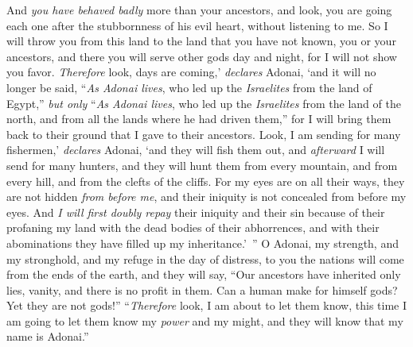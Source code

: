 \begin{biblechapter}
\verse And \textit{you have behaved badly} more than your ancestors, and look, you are going each one after the stubbornness of his evil heart, without listening to me.
\verse So I will throw you from this land to the land that you have not known, you or your ancestors, and there you will serve other gods day and night, for I will not show you favor.
 \textit{Therefore} look, days are coming,’ \textit{declares} Adonai, ‘and it will no longer be said, “\textit{As Adonai lives}, who led up the \textit{Israelites} from the land of Egypt,”
\verse \textit{but only} “\textit{As Adonai lives}, who led up the \textit{Israelites} from the land of the north, and from all the lands where he had driven them,” for I will bring them back to their ground that I gave to their ancestors.
\verse Look, I am sending for many fishermen,’ \textit{declares} Adonai, ‘and they will fish them out, and \textit{afterward} I will send for many hunters, and they will hunt them from every mountain, and from every hill, and from the clefts of the cliffs.
\verse For my eyes are on all their ways, they are not hidden \textit{from before me}, and their iniquity is not concealed from before my eyes.
\verse And \textit{I will first doubly repay} their iniquity and their sin because of their profaning my land with the dead bodies of their abhorrences, and with their abominations they have filled up my inheritance.’ ”
\verse O Adonai, my strength, and my stronghold, 
and my refuge in the day of distress, 
to you the nations will come from the ends of the earth, 
and they will say, “Our ancestors have inherited only lies, 
vanity, and there is no profit in them.
\verse Can a human make for himself gods? 
Yet they are not gods!”
\verse “\textit{Therefore} look, I am about to let them know, 
this time I am going to let them know 
my \textit{power} and my might, 
and they will know that my name is Adonai.”
\end{biblechapter}

